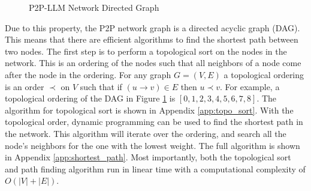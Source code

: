 \documentclass[preprint,twoside,11pt]{article}
\begin{document}
\begin{figure}
	\centering
	\caption{P2P-LLM Network Directed Graph}
	\label{fig:layered_graph}
\end{figure}

Due to this property, the P2P network graph is a directed acyclic graph (DAG). This means that there are efficient
algorithms to find the shortest path between two nodes. The first step is to perform a topological sort on the nodes in the network.
This is an ordering of the nodes such that all neighbors of a node come after the node in the ordering.
For any graph $G = (V, E)$ a topological ordering is an order $\prec$ on $V$ such that if $(u \rightarrow v) \in E$ then $u \prec v$.
For example, a topological ordering of the DAG in Figure \ref{fig:layered_graph} is $[0,1,2,3,4,5,6,7,8]$.
The algorithm for topological sort is shown in Appendix \ref{app:topo_sort}. With the topological order, dynamic programming can be used to find the shortest path in the network.
This algorithm will iterate over the ordering, and search all the node's neighbors for the one with the lowest weight.
The full algorithm is shown in Appendix \ref{app:shortest_path}. Most importantly, both the topological sort and path finding algorithm run in linear time
with a computational complexity of $O(|V| + |E|)$.
\end{document}
